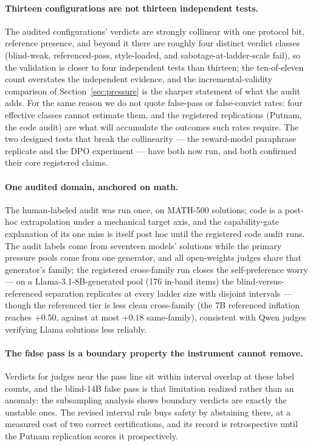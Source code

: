\documentclass[11pt]{article}
\begin{document}
\paragraph{Thirteen configurations are not thirteen independent tests.}
The audited configurations' verdicts are strongly collinear with one protocol bit, reference presence, and beyond it there are roughly four distinct verdict classes (blind-weak, referenced-pass, style-loaded, and sabotage-at-ladder-scale fail), so the validation is closer to four independent tests than thirteen; the ten-of-eleven count overstates the independent evidence, and the incremental-validity comparison of Section~\ref{sec:pressure} is the sharper statement of what the audit adds.
For the same reason we do not quote false-pass or false-convict rates: four effective classes cannot estimate them, and the registered replications (Putnam, the code audit) are what will accumulate the outcomes such rates require.
The two designed tests that break the collinearity --- the reward-model paraphrase replicate and the DPO experiment --- have both now run, and both confirmed their core registered claims.

\paragraph{One audited domain, anchored on math.}
The human-labeled audit was run once, on \textsc{MATH-500} solutions; code is a post-hoc extrapolation under a mechanical target axis, and the capability-gate explanation of its one miss is itself post hoc until the registered code audit runs.
The audit labels come from seventeen models' solutions while the primary pressure pools come from one generator, and all open-weights judges share that generator's family; the registered cross-family run closes the self-preference worry --- on a Llama-3.1-8B-generated pool (176 in-band items) the blind-versus-referenced separation replicates at every ladder size with disjoint intervals --- though the referenced tier is less clean cross-family (the 7B referenced inflation reaches $+0.50$, against at most $+0.18$ same-family), consistent with Qwen judges verifying Llama solutions less reliably.

\paragraph{The false pass is a boundary property the instrument cannot remove.}
Verdicts for judges near the pass line sit within interval overlap at these label counts, and the blind-14B false pass is that limitation realized rather than an anomaly: the subsampling analysis shows boundary verdicts are exactly the unstable ones.
The revised interval rule buys safety by abstaining there, at a measured cost of two correct certifications, and its record is retrospective until the Putnam replication scores it prospectively.
\end{document}
